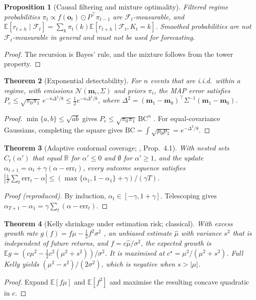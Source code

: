 \documentclass[10pt,twocolumn,letterpaper]{article}
\theoremstyle{plain}
\newtheorem{theorem}{Theorem}
\newtheorem{proposition}[theorem]{Proposition}
\theoremstyle{definition}
\theoremstyle{remark}
\newcommand{\R}{\mathbb{R}}
\newcommand{\E}{\mathbb{E}}
\newcommand{\N}{\mathcal{N}}
\newcommand{\F}{\mathcal{F}}
\begin{document}
\begin{proposition}[Causal filtering and mixture optimality]\label{prop:filter}
Filtered regime probabilities $\pi_t\propto f(\bm o_t)\odot P^\top\pi_{t-1}$ are $\F_t$-measurable, and $\E[r_{t+h}\mid\F_t]=\sum_k\pi_t(k)\E[r_{t+h}\mid\F_t,K_t=k]$. Smoothed probabilities are not $\F_t$-measurable in general and must not be used for forecasting.
\end{proposition}
\begin{proof}
The recursion is Bayes' rule, and the mixture follows from the tower property.
\end{proof}

\begin{theorem}[Exponential detectability]\label{thm:detect}
For $n$ events that are i.i.d.\ within a regime, with emissions $\N(\bm m_i,\Sigma)$ and priors $\pi_i$, the MAP error satisfies $P_e\le\sqrt{\pi_0\pi_1}\,e^{-n\Delta^2/8}\le\tfrac12e^{-n\Delta^2/8}$, where $\Delta^2=(\bm m_1-\bm m_0)^\top\Sigma^{-1}(\bm m_1-\bm m_0)$.
\end{theorem}
\begin{proof}
$\min\{a,b\}\le\sqrt{ab}$ gives $P_e\le\sqrt{\pi_0\pi_1}\,\mathrm{BC}^n$ \citep{bhattacharyya1943,kailath1967}. For equal-covariance Gaussians, completing the square gives $\mathrm{BC}=\int\sqrt{p_0p_1}=e^{-\Delta^2/8}$.
\end{proof}

\begin{theorem}[Adaptive conformal coverage; \citealp{gibbs2021}, Prop.~4.1]\label{thm:aci}
With nested sets $\hat C_t(\alpha')$ that equal $\R$ for $\alpha'\le0$ and $\emptyset$ for $\alpha'\ge1$, and the update $\alpha_{t+1}=\alpha_t+\gamma(\alpha-\mathrm{err}_t)$, every outcome sequence satisfies $|\frac1T\sum_t\mathrm{err}_t-\alpha|\le(\max\{\alpha_1,1-\alpha_1\}+\gamma)/(\gamma T)$.
\end{theorem}
\begin{proof}[Proof (reproduced)]
By induction, $\alpha_t\in[-\gamma,1+\gamma]$. Telescoping gives $\alpha_{T+1}-\alpha_1=\gamma\sum_t(\alpha-\mathrm{err}_t)$.
\end{proof}

\begin{theorem}[Kelly shrinkage under estimation risk; classical]\label{thm:kelly}
With excess growth rate $g(f)=f\mu-\tfrac12f^2\sigma^2$ \citep{merton1969,kelly1956}, an unbiased estimate $\hat\mu$ with variance $s^2$ that is independent of future returns, and $f=c\hat\mu/\sigma^2$, the expected growth is $\E g=(c\mu^2-\tfrac12c^2(\mu^2+s^2))/\sigma^2$. It is maximised at $c^\star=\mu^2/(\mu^2+s^2)$. Full Kelly yields $(\mu^2-s^2)/(2\sigma^2)$, which is negative when $s>|\mu|$.
\end{theorem}
\begin{proof}
Expand $\E[f\mu]$ and $\E[f^2]$ and maximise the resulting concave quadratic in $c$.
\end{proof}
\end{document}
